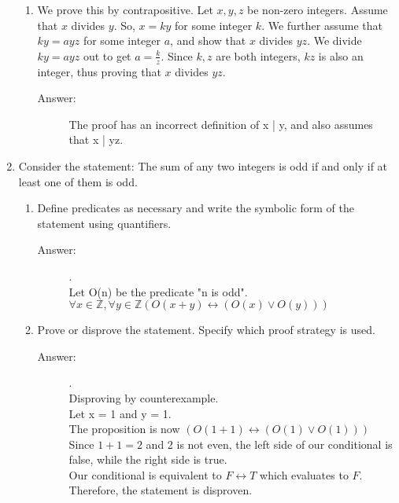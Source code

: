 \documentclass[12pt, oneside]{article}
\begin{document}
\begin{enumerate}
\begin{enumerate}
    \item We prove this by contrapositive. Let $x,y, z$ be non-zero integers. Assume that $x$ divides $y$. So, $x=ky$ for some integer $k$. We further assume that $ky=ayz$ for some integer $a$, and show that $x$ divides $yz$. We divide  $ky=ayz$ out to get $a=\frac{k}{z}$. Since $k, z$ are both integers, $kz$ is also an integer, thus proving that $x$ divides $yz$.

    \begin{description}
        \item[Answer:] The proof has an incorrect definition of x | y, and also assumes that x | yz.
    \end{description}

\end{enumerate}

\item Consider the statement: The sum of any two integers is odd if and only if at least one of them is odd.
\begin{enumerate}
    \item Define predicates as necessary and write the symbolic form of the statement using quantifiers.
    
    \begin{description}
        \item[Answer:] .\\
        Let O(n) be the predicate "n is odd". \\
        $\forall x \in \mathbb{Z}, \forall y \in \mathbb{Z} (O(x+y) \leftrightarrow (O(x) \lor O(y)))$
    \end{description}
    
    \item Prove or disprove the statement. Specify which proof strategy is used.
    
    \begin{description}
        \item[Answer:] .\\
        Disproving by counterexample. \\
        Let x = 1 and y = 1. \\
        The proposition is now $(O(1+1) \leftrightarrow (O(1) \lor O(1)))$\\
        Since $1+1=2$ and 2 is not even, the left side of our conditional is false, while the right side is true.\\
        Our conditional is equivalent to $F \leftrightarrow T$ which evaluates to $F$.\\
        Therefore, the statement is disproven.
    \end{description}


\end{enumerate}
\end{enumerate}
\end{document}
